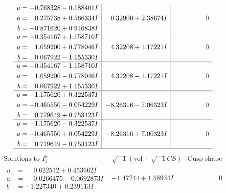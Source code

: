 \documentclass[1p]{elsarticle_modified}
\theoremstyle{definition}
\newcommand{\I}{\sqrt{-1}}
\begin{document}
$$\begin{array}{c|c|c}
\begin{aligned}
u &= -0.768328 - 0.188401 I \\
a &= \phantom{-}0.275738 + 0.566334 I \\
b &= -0.871620 + 0.946838 I\end{aligned}
 & \phantom{-}0.32900 + 2.38674 I & \phantom{-0.000000 } 0 \\ \hline\begin{aligned}
u &= -0.354167 + 1.158710 I \\
a &= \phantom{-}1.059200 + 0.778046 I \\
b &= \phantom{-}0.067922 - 1.155330 I\end{aligned}
 & \phantom{-}4.32208 + 1.17221 I & \phantom{-0.000000 } 0 \\ \hline\begin{aligned}
u &= -0.354167 - 1.158710 I \\
a &= \phantom{-}1.059200 - 0.778046 I \\
b &= \phantom{-}0.067922 + 1.155330 I\end{aligned}
 & \phantom{-}4.32208 - 1.17221 I & \phantom{-0.000000 } 0 \\ \hline\begin{aligned}
u &= -1.175620 + 0.322537 I \\
a &= -0.465550 - 0.054229 I \\
b &= \phantom{-}0.779649 + 0.753123 I\end{aligned}
 & -8.26316 - 7.06323 I & \phantom{-0.000000 } 0 \\ \hline\begin{aligned}
u &= -1.175620 - 0.322537 I \\
a &= -0.465550 + 0.054229 I \\
b &= \phantom{-}0.779649 - 0.753123 I\end{aligned}
 & -8.26316 + 7.06323 I & \phantom{-0.000000 } 0\\
 \hline 
 \end{array}$$\newpage$$\begin{array}{c|c|c}  
\text{Solutions to }I^u_{1}& \I (\text{vol} + \sqrt{-1}CS) & \text{Cusp shape}\\
 \hline 
\begin{aligned}
u &= \phantom{-}0.622512 + 0.453662 I \\
a &= \phantom{-}0.0266475 - 0.0692873 I \\
b &= -1.227340 + 0.239113 I\end{aligned}
 & -1.47244 + 1.58934 I & \phantom{-0.000000 } 0 \\ \hline\begin{aligned}

\end{aligned}
\end{array}$$
\end{document}
